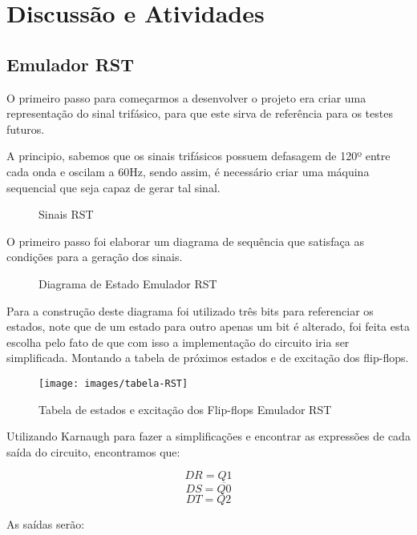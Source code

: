 \chapter{Discussão e Atividades}

\section{Emulador RST}

O primeiro passo para começarmos a desenvolver o projeto era criar uma representação do sinal trifásico, para que este sirva de referência para os testes futuros.

A principio, sabemos que os sinais trifásicos possuem defasagem de 120º entre cada onda e oscilam a 60Hz, sendo assim, é necessário criar uma máquina sequencial que seja capaz de gerar tal sinal.

\begin{figure}[!htp]
	\centering
	\caption{Sinais RST}
	\label{fig:sinais-rst}
\end{figure}

O primeiro passo foi elaborar um diagrama de sequência que satisfaça as condições para a geração dos sinais.

\begin{figure}[!htp]
	\centering
	\caption{Diagrama de Estado Emulador RST}
	\label{fig:disgrama-de-estado-EmuladorRST}
\end{figure}

Para a construção deste diagrama foi utilizado três bits para referenciar os estados, note que de um estado para outro apenas um bit é alterado, foi feita esta escolha pelo fato de que com isso a implementação do circuito iria ser simplificada. Montando a tabela de próximos estados e de excitação dos flip-flops.

\begin{figure}[!htp]
	\centering
	\caption{Tabela de estados e excitação dos Flip-flops Emulador RST}
	\texttt{[image: images/tabela-RST]}
	\label{fig:tabela-RST}
\end{figure}

Utilizando Karnaugh para fazer a simplificações e encontrar as expressões de cada saída do circuito, encontramos que:

$$DR = Q1$$
$$DS = \overline{Q0}$$
$$DT = Q2$$

As saídas serão:

